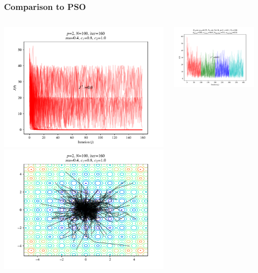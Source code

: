 \documentclass{beamer}
\begin{document}
\begin{frame}
\frametitle{Comparison to PSO}
\begin{columns}[T]
    \begin{center}
      \includegraphics[scale=0.3]{assets/pso_J}
      \includegraphics[scale=0.3]{assets/pso_theta}
    \end{center}
  \begin{center}
    \includegraphics[scale=0.3]{assets/rastrigin_colony_ed_0_J}

\end{center}
\end{columns}
\end{frame}
\end{document}
